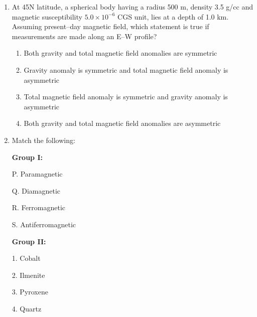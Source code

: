 \documentclass[journal,12pt,onecolumn]{IEEEtran}
\theoremstyle{remark}
\begin{document}
\begin{enumerate}[resume]
Which station shows the maximum anomaly after linear drift correction?

\begin{multicols}{4}
\begin{enumerate}
\item 2  
\item 3  
\item 4  
\item 5  
\end{enumerate}
\end{multicols}
\vspace{0.5cm}

\item At 45N latitude, a spherical body having a radius 500 m, density 3.5 g/cc and magnetic susceptibility $5.0 \times 10^{-6}$ CGS unit, lies at a depth of 1.0 km. Assuming present--day magnetic field, which statement is true if measurements are made along an E--W profile?
\begin{enumerate}

\item Both gravity and total magnetic field anomalies are symmetric  
\item Gravity anomaly is symmetric and total magnetic field anomaly is asymmetric  
\item Total magnetic field anomaly is symmetric and gravity anomaly is asymmetric  
\item Both gravity and total magnetic field anomalies are asymmetric  
\vspace{0.5cm}
\end{enumerate}

\item Match the following:

\noindent
\begin{minipage}[t]{0.45\textwidth}
\textbf{Group I:}  

P. Paramagnetic  

Q. Diamagnetic  

R. Ferromagnetic  

S. Antiferromagnetic  
\end{minipage}
\hfill
\begin{minipage}[t]{0.45\textwidth}
\textbf{Group II:}  

1. Cobalt  

2. Ilmenite  

3. Pyroxene  

4. Quartz  
\end{minipage}


\end{enumerate}
\end{document}
